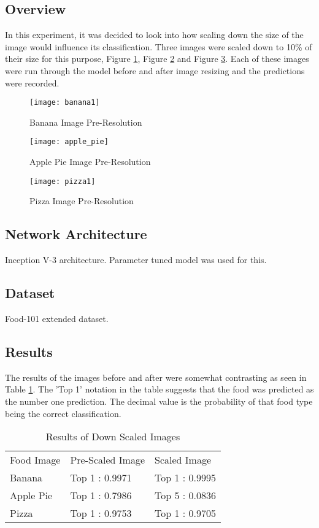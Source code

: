 \subsection*{Overview}
In this experiment, it was decided to look into how scaling down the size of the image would influence its classification. Three images were scaled down to 10\% of their size for this purpose, Figure \ref{fig:bananaPreRes}, Figure \ref{fig:apple_piePreRes} and Figure \ref{fig:pizzaPreRes}. Each of these images were run through the model before and after image resizing and the predictions were recorded.

\begin{figure}
    \texttt{[image: banana1]}
    \caption{Banana Image Pre-Resolution}
    \label{fig:bananaPreRes}
\end{figure}

\begin{figure}
    \texttt{[image: apple\_pie]}
    \caption{Apple Pie Image Pre-Resolution}
    \label{fig:apple_piePreRes}
\end{figure}

\begin{figure}
    \texttt{[image: pizza1]}
    \caption{Pizza Image Pre-Resolution}
    \label{fig:pizzaPreRes}
\end{figure}

\subsection*{Network Architecture}
Inception V-3 architecture. Parameter tuned model was used for this.

\subsection*{Dataset}
Food-101 extended dataset.

\subsection*{Results}
The results of the images before and after were somewhat contrasting as seen in Table \ref{scaledImages}.
The 'Top 1' notation in the table suggests that the food was predicted as the number one prediction. The decimal value is the probability of that food type being the correct classification.

\begin{table}[]
\centering
\caption{Results of Down Scaled Images}
\label{scaledImages}
\begin{tabular}{lll}
Food Image & Pre-Scaled Image & Scaled Image   \\
Banana     & Top 1 : 0.9971   & Top 1 : 0.9995 \\
Apple Pie  & Top 1 : 0.7986   & Top 5 : 0.0836 \\
Pizza      & Top 1 : 0.9753   & Top 1 : 0.9705
\end{tabular}
\end{table}

